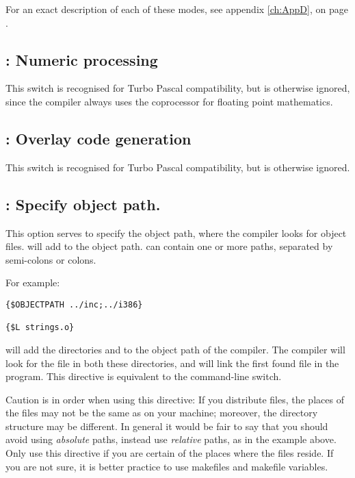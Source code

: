 For an exact description of each of these modes, see appendix \ref{ch:AppD},
on page \pageref{ch:AppD}.

\subsection{ : Numeric processing }

This switch is recognised for Turbo Pascal compatibility, but is otherwise
ignored, since the compiler always uses the coprocessor for floating point
mathematics.

\subsection{ : Overlay code generation }

This switch is recognised for Turbo Pascal compatibility, but is otherwise
ignored.

\subsection{ : Specify object path.}

This option serves to specify the object path, where the compiler looks for
object files.  will add  to the object
path.  can contain one or more paths, separated by semi-colons or
colons.

For example:
\begin{verbatim}
{$OBJECTPATH ../inc;../i386}

{$L strings.o}
\end{verbatim}

will add the directories  and  to the
object path of the compiler. The compiler will look for the file 
in both these directories, and will link the first found file in the
program. This directive is equivalent to the  command-line switch.

Caution is in order when using this directive: If you distribute files, the
places of the files may not be the same as on your machine; moreover, the
directory structure may be different. In general it would be fair to say
that you should avoid using {\em absolute} paths, instead use {\em relative}
paths, as in the example above. Only use this directive if you are certain
of the places where the files reside. If you are not sure, it is better
practice to use makefiles and makefile variables.


